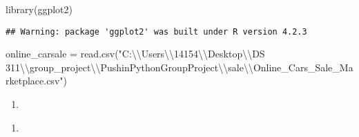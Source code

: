 \documentclass[
]{article}
\newenvironment{Shaded}{\begin{snugshade}}{\end{snugshade}}
\newcommand{\FunctionTok}[1]{\textcolor[rgb]{0.00,0.00,0.00}{#1}}
\newcommand{\NormalTok}[1]{#1}
\newcommand{\OtherTok}[1]{\textcolor[rgb]{0.56,0.35,0.01}{#1}}
\newcommand{\SpecialCharTok}[1]{\textcolor[rgb]{0.00,0.00,0.00}{#1}}
\newcommand{\StringTok}[1]{\textcolor[rgb]{0.31,0.60,0.02}{#1}}
\providecommand{\tightlist}{%
  \setlength{\itemsep}{0pt}\setlength{\parskip}{0pt}}
\begin{document}
\begin{Shaded}
\begin{Highlighting}[]
\FunctionTok{library}\NormalTok{(ggplot2)}
\end{Highlighting}
\end{Shaded}

\begin{verbatim}
## Warning: package 'ggplot2' was built under R version 4.2.3
\end{verbatim}

\begin{Shaded}
\begin{Highlighting}[]
\NormalTok{online\_carsale }\OtherTok{=} \FunctionTok{read.csv}\NormalTok{(}\StringTok{"C:}\SpecialCharTok{\textbackslash{}\textbackslash{}}\StringTok{Users}\SpecialCharTok{\textbackslash{}\textbackslash{}}\StringTok{14154}\SpecialCharTok{\textbackslash{}\textbackslash{}}\StringTok{Desktop}\SpecialCharTok{\textbackslash{}\textbackslash{}}\StringTok{DS 311}\SpecialCharTok{\textbackslash{}\textbackslash{}}\StringTok{group\_project}\SpecialCharTok{\textbackslash{}\textbackslash{}}\StringTok{PushinPythonGroupProject}\SpecialCharTok{\textbackslash{}\textbackslash{}}\StringTok{sale}\SpecialCharTok{\textbackslash{}\textbackslash{}}\StringTok{Online\_Cars\_Sale\_Marketplace.csv"}\NormalTok{)}
\end{Highlighting}
\end{Shaded}

\begin{enumerate}
\def\labelenumi{\arabic{enumi}.}
\tightlist
\item
\end{enumerate}

\begin{Shaded}
\end{Shaded}

\begin{enumerate}
\def\labelenumi{\arabic{enumi}.}
\setcounter{enumi}{1}
\tightlist
\item
\end{enumerate}

\begin{Shaded}
\end{Shaded}
\end{document}
